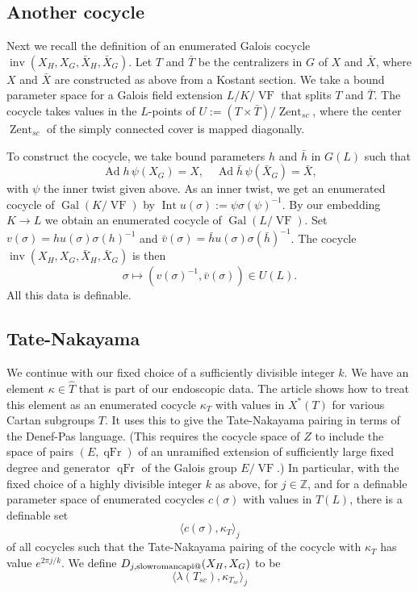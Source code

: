 \documentclass[12pt]{amsart}
\makeatletter
\newcommand*{\rom}[1]{\text{\expandafter\@slowromancap\romannumeral #1@}}
\newcommand{\op}[1]{\operatorname{#1}}
\newcommand{\ring}[1]{{\mathbb #1}}
\def\VF{{\op{VF}}}
\theoremstyle{plain}
\theoremstyle{definition}
\makeatother
\begin{document}
\subsection{Another cocycle}

Next we recall the definition of an enumerated Galois cocycle
$\op{inv}(X_H,X_G,\bar X_H,\bar X_G)$.  Let $T$ and $\bar T$ be the
centralizers in $G$ of $X$ and $\bar X$, where $X$ and $\bar X$ are
constructed as above from a Kostant section.  We take a bound
parameter space for a Galois field extension $L/K/\VF$ that splits $T$
and $\bar T$.  The cocycle takes values in the $L$-points of $U:=
(T\times \bar T)/\op{Zent}_{sc}$, where the center $\op{Zent}_{sc}$ of the simply
connected cover is mapped diagonally.

To construct the cocycle, we take bound parameters $h$ and $\bar h$
 in $G(L)$ such that
\[
\op{Ad} h\,\psi(X_G)  = X,\quad \op{Ad} \bar h\, \psi(\bar X_G) = \bar X,
\]
with $\psi$ the inner twist given above.  As an inner twist, we get an
enumerated cocycle of $\op{Gal}(K/\VF)$ by $\op{Int} u(\sigma) := \psi
\sigma(\psi)^{-1}$.  By our embedding $K\to L$ we obtain an enumerated
cocycle of $\op{Gal}(L/\VF)$.  Set $v(\sigma) = h u(\sigma)
\sigma(h)^{-1}$ and $\bar v(\sigma) = \bar h u(\sigma) \sigma(\bar
h)^{-1}$. The cocycle $\op{inv}(X_H,X_G,\bar X_H,\bar X_G)$ is then
\[
\sigma \mapsto (v(\sigma)^{-1},\bar v(\sigma))\in U(L).
\]
All this data is definable.

\subsection{Tate-Nakayama}

We continue with our fixed choice of a sufficiently divisible integer
$k$.  We have an element $\kappa\in \hat T$ that is part of our
endoscopic data.  The article \cite{CHL} shows how to treat this
element as an enumerated cocycle $\kappa_T$ with values in $X^*(T)$
for various Cartan subgroups $T$.  It uses this to give the
Tate-Nakayama pairing in terms of the Denef-Pas language.  (This
requires the cocycle space of $Z$ to include the space of pairs
$(E,\op{qFr})$ of an unramified extension of sufficiently large fixed
degree and generator $\op{qFr}$ of the Galois group $E/\VF$.)  In
particular, with the fixed choice of a highly divisible integer $k$ as
above, for $j\in \ring{Z}$, and for a definable parameter space of
enumerated cocycles $c(\sigma)$ with values in $T(L)$, there is a
definable set
\[
\langle c(\sigma),\kappa_T\rangle_j
\]
of all cocycles such that the Tate-Nakayama pairing of the cocycle with
$\kappa_T$ has value $e^{2\pi j/k}$.  We define $D_{j,\rom1}(X_H,X_G)$ to
be
\[
\langle \lambda(T_{sc}),\kappa_{T_{sc}}\rangle_j
\]
\end{document}
